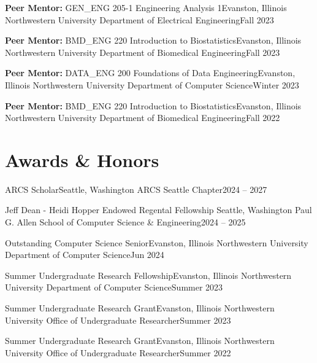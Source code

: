\documentclass{resume}
\begin{document}
    \resumeSubheading
      {\textbf{Peer Mentor:} GEN\_ENG 205-1 Engineering Analysis 1}{Evanston, Illinois}
      {Northwestern University Department of Electrical Engineering}{Fall 2023}
    
    \resumeSubheading
      {\textbf{Peer Mentor:} BMD\_ENG 220 Introduction to Biostatistics}{Evanston, Illinois}
      {Northwestern University Department of Biomedical Engineering}{Fall 2023}
    
    \resumeSubheading
      {\textbf{Peer Mentor:} DATA\_ENG 200 Foundations of Data Engineering}{Evanston, Illinois}
      {Northwestern University Department of Computer Science}{Winter 2023}
    
    \resumeSubheading
      {\textbf{Peer Mentor:} BMD\_ENG 220 Introduction to Biostatistics}{Evanston, Illinois}
      {Northwestern University Department of Biomedical Engineering}{Fall 2022}
    
  \resumeSubHeadingListEnd



\section{Awards \& Honors}
  \vspace{3pt}
  \resumeSubHeadingListStart

    \resumeSubheading
      {ARCS Scholar}{Seattle, Washington}
      {ARCS Seattle Chapter}{2024 – 2027}
    
    \resumeSubheading
      {Jeff Dean - Heidi Hopper Endowed Regental Fellowship }{Seattle, Washington}
      {Paul G. Allen School of Computer Science \& Engineering}{2024 – 2025}
    
    \resumeSubheading
      {Outstanding Computer Science Senior}{Evanston, Illinois}
      {Northwestern University Department of Computer Science}{Jun 2024}
    
    \resumeSubheading
      {Summer Undergraduate Research Fellowship}{Evanston, Illinois}
      {Northwestern University Department of Computer Science}{Summer 2023}

    \resumeSubheading
      {Summer Undergraduate Research Grant}{Evanston, Illinois}
      {Northwestern University Office of Undergraduate Researcher}{Summer 2023}
    
    \resumeSubheading
      {Summer Undergraduate Research Grant}{Evanston, Illinois}
      {Northwestern University Office of Undergraduate Researcher}{Summer 2022}
    
\end{document}
